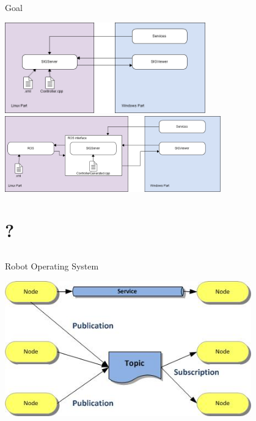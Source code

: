 \documentclass[11pt]{beamer}
\begin{document}
\begin{frame}{Goal}
	\begin{center}
		\includegraphics[width=0.65\textwidth]{images/SIGVerseSimple.png}\\
		\vspace{0.3cm}
		\includegraphics[width=0.7\textwidth]{images/SIGVerseROS.png}	
	\end{center}
\end{frame}

\section{?}
\subsection*{}
\begin{frame}{Robot Operating System}
	\begin{center}
		\includegraphics[width=0.8\textwidth]{images/Concepts-de-base-ROS.jpg}
	\end{center}
\end{frame}
\end{document}
